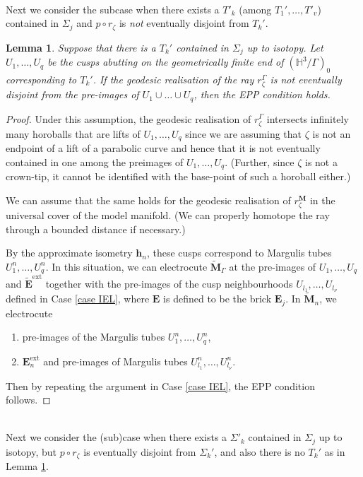 \documentclass{amsart}
\newtheorem{lemma}[theorem]{Lemma}
\theoremstyle{definition}
\newcommand\HHH{{\mathbb H}}
\begin{document}
\\
Next we consider the subcase when there exists a $T'_k$  (among $T_1', \dots , T'_v$) contained in $\Sigma_j$ and $p \circ r_\zeta$ is {\em not} eventually disjoint from $T_k'$.

\begin{lemma}
\label{smaller T}
Suppose that there is a $T_k'$   contained in $\Sigma_j$ up to isotopy.
Let $U_1, \dots, U_q$ be the cusps abutting on the geometrically finite end of $(\HHH^3/\Gamma)_0$ corresponding to $T_k'$.
If the geodesic  realisation of the ray $r_\zeta^\Gamma$  is not eventually disjoint from the pre-images of $U_1\cup \dots \cup U_q$, then the EPP condition holds.
\end{lemma}
\begin{proof}
Under this assumption, the geodesic realisation of $r_\zeta^\Gamma$ intersects infinitely many horoballs that are lifts of $U_1, \dots, U_q$ since we are assuming that $\zeta$ is not an endpoint of a lift of a parabolic curve and hence that it is not eventually contained in one among the preimages of $U_1, \dots , U_q$. (Further, since $\zeta$ is not a crown-tip, it cannot be identified with the base-point of such a horoball either.)

We can assume that the same holds for the geodesic realisation of $r_\zeta^{\mathbf M}$ in the universal cover of the model manifold.
(We can properly homotope the ray through a bounded distance if necessary.)

By the approximate isometry $\mathbf h_n$, these cusps correspond to Margulis tubes $U^n_1, \dots , U_q^n$.
In this situation, we can electrocute $\widetilde{\mathbf M}_\Gamma$ at the pre-images of $U_1, \dots , U_q$ and $\widetilde{\mathbf E}^\mathrm{ext}$ together with the pre-images of the cusp neighbourhoods $U_{l_1}, \dots, U_{l_\nu}$ defined in Case \ref{case IEL}, where $\mathbf E$ is defined to be the brick $\mathbf E_j$.
In $\widetilde{\mathbf M}_n$, we  electrocute  
\begin{enumerate}
\item pre-images of the  Margulis tubes $U^n_1, \dots , U_q^n$,
\item  $\mathbf E^\mathrm{ext}_n$ and pre-images of Margulis tubes $U^n_{l_1}, \dots , U^n_{l_\nu}$.
\end{enumerate}  
Then by repeating the argument in Case \ref{case IEL},  the EPP condition follows.
\end{proof}

\\
Next we consider the (sub)case when there exists a $\Sigma'_k$ contained in $\Sigma_j$ up to isotopy, but $p  \circ r_\zeta$ is eventually disjoint from $\Sigma_k'$, and also there is no $T_k'$ as in Lemma \ref{smaller T}.
\end{document}
